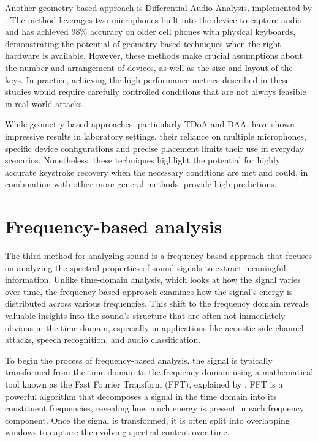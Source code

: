 \documentclass[a4paper,11pt,twoside]{report}
\theoremstyle{definition}
\begin{document}
Another geometry-based approach is Differential Audio Analysis, implemented by \textit{\cite{daa}}. The method leverages two microphones built into the device to capture audio and has achieved 98\% accuracy on older cell phones with physical keyboards, demonstrating the potential of geometry-based techniques when the right hardware is available. However, these methods make crucial assumptions about the number and arrangement of devices, as well as the size and layout of the keys. In practice, achieving the high performance metrics described in these studies would require carefully controlled conditions that are not always feasible in real-world attacks.

While geometry-based approaches, particularly TDoA and DAA, have shown impressive results in laboratory settings, their reliance on multiple microphones, specific device configurations and precise placement limits their use in everyday scenarios. Nonetheless, these techniques highlight the potential for highly accurate keystroke recovery when the necessary conditions are met and could, in combination with other more general methods, provide high predictions.

\section{Frequency-based analysis}

The third method for analyzing sound is a frequency-based approach that focuses on analyzing the spectral properties of sound signals to extract meaningful information. Unlike time-domain analysis, which looks at how the signal varies over time, the frequency-based approach examines how the signal’s energy is distributed across various frequencies. This shift to the frequency domain reveals valuable insights into the sound's structure that are often not immediately obvious in the time domain, especially in applications like acoustic side-channel attacks, speech recognition, and audio classification.

To begin the process of frequency-based analysis, the signal is typically transformed from the time domain to the frequency domain using a mathematical tool known as the Fast Fourier Transform (FFT), explained by \textit{\cite{fft}}. FFT is a powerful algorithm that decomposes a signal in the time domain into its constituent frequencies, revealing how much energy is present in each frequency component. Once the signal is transformed, it is often split into overlapping windows to capture the evolving spectral content over time.
\end{document}
